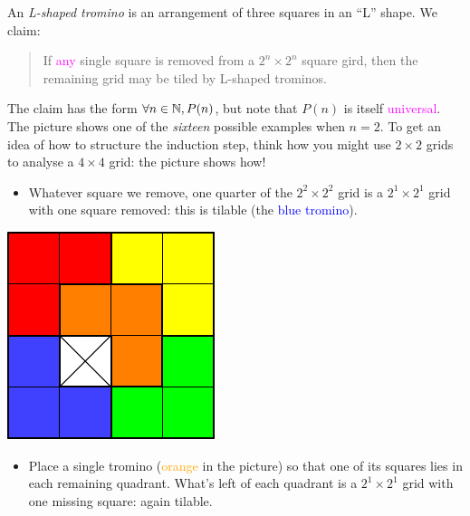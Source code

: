 \begin{example}{}{}
	An \emph{L-shaped tromino} is an arrangement of three squares in an ``L'' shape. We claim:\par
	\begin{minipage}[t]{0.75\linewidth}\vspace{-4pt}
		\begin{quote}
			If \textcolor{Magenta}{any} single square is removed from a $2^n\times 2^n$ square gird, then the remaining grid may be tiled by L-shaped trominos.
		\end{quote}
		\vspace{-6pt}
		The claim has the form $\forall n\in\mathbb{N},P(n)$, but note that $P(n)$ is itself \textcolor{Magenta}{universal}. The picture shows one of the \emph{sixteen} possible examples when $n=2$. To get an idea of how to structure the induction step, think how you might use $2\times 2$ grids to analyse a $4\times 4$ grid: the picture shows how!
		\begin{itemize}
		  \item Whatever square we remove, one quarter of the $2^2\times 2^2$ grid is a $2^1\times 2^1$ grid with one square removed: this is tilable (the \textcolor{blue}{blue tromino}).
		\end{itemize}
	\end{minipage}
	\hfill
	\begin{minipage}[t]{0.24\linewidth}\vspace{0pt}
		\flushright\includegraphics{induction-11-tilingexample}
	\end{minipage}
	\par

	\vspace{-2pt}
		
	\begin{itemize}
	 	\item Place a single tromino (\textcolor{orange}{orange} in the picture) so that one of its squares lies in each remaining quadrant. What's left of each quadrant is a $2^1\times 2^1$ grid with one missing square: again tilable.
	\end{itemize}
	

\end{example}
